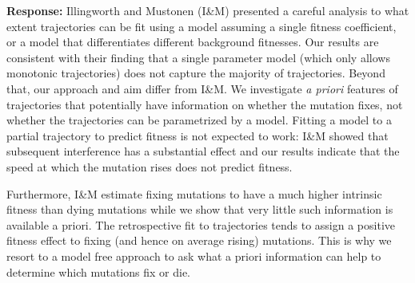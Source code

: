 \documentclass[aps,rmp,onecolumn]{revtex4-1}
\newcommand{\response}[1]{{\it {\color{response}\textbf{Response:} #1}}\vskip 5mm}
\begin{document}
\response{
	Illingworth and Mustonen (I\&M) presented a careful analysis to what extent trajectories can be fit using a model assuming a single fitness coefficient, or a model that differentiates different background fitnesses.
	Our results are consistent with their finding that a single parameter model (which only allows monotonic trajectories) does not capture the majority of trajectories.
	Beyond that, our approach and aim differ from I\&M.
	We investigate \emph{a priori} features of trajectories that potentially have information on whether the mutation fixes, not whether the trajectories can be parametrized by a model.
	Fitting a model to a partial trajectory to predict fitness is not expected to work: I\&M showed that subsequent interference has a substantial effect and our results indicate that the speed at which the mutation rises does not predict fitness.

	Furthermore, I\&M estimate fixing mutations to have a much higher intrinsic fitness than dying mutations while we show that very little such information is available a priori.
	The retrospective fit to trajectories tends to assign a positive fitness effect to fixing (and hence on average rising) mutations.
	This is why we resort to a model free approach to ask what a priori information can help to determine which mutations fix or die.
}
\end{document}
